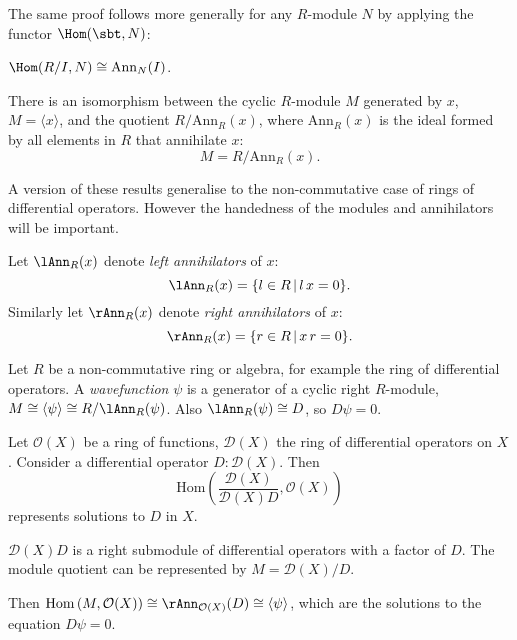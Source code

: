     The same proof follows more generally for any \(R\)-module \(N\) by applying the functor \( \Hom(\sbt, N)\):
    \begin{corollary}
       \(\Hom(R/I,N) \cong \mathrm{Ann}_{N}(I)\).
    \end{corollary}
       
    \begin{lem} There is an isomorphism between the cyclic \(R\)-module \(M\) generated by \(x\), \(M = \langle x \rangle \), and the quotient 
    \( R / \mathrm{Ann}_R(x)\), where \( \mathrm{Ann}_R(x)\) is the ideal formed by all elements in \(R\) that annihilate \(x\):
    \[M =R/\mathrm{Ann}_R(x).\]
    \end{lem}
    
    
    A version of these results generalise to the non-commutative case of rings of differential operators. However the handedness of the modules and annihilators will be important.
    
    \begin{defn}
    Let \( {\lAnn}_R(x) \) denote \emph{left annihilators} of \(x\):
    \[ {\lAnn}_R(x) = \{ l \in R\, | \, l\, x = 0\}. \]
    Similarly let \({\rAnn}_R(x)\) denote \emph{right annihilators} of \(x\):
    \[ {\rAnn}_R(x) = \{r \in R \,| \,x \,r = 0 \}. \]
    \end{defn}     
    

    Let \(R\) be a non-commutative ring or algebra, for example the ring of differential operators.  A \emph{wavefunction} \( \psi\) is a generator of a cyclic right \(R\)-module, \(M  \cong \langle \psi \rangle \cong R/{\lAnn}_R(\psi) \). Also \({\lAnn}_R(\psi) \cong D\), so \( D \psi = 0\).
    
    \begin{ex}\label{ex:sols}
    Let \( \mathcal{O}(X)\) be a ring of functions, \( \mathcal{D}(X)\) the ring of differential operators on \(X\). Consider a differential operator \( D : \mathcal{D}(X)\). Then 
    \[ \mathrm{Hom}\left(\frac{\mathcal{D}(X)}{  \mathcal{D}(X)  D } , \mathcal{O}(X) \right)\]  
    represents solutions to \(D\) in \(X\).
    
    \(\mathcal{D}(X)  D \) is a right submodule of differential operators with a factor of \(D\). The module quotient can be represented by \(M=\mathcal{D}(X)/D\).  
    
    Then \( \mathrm{Hom}\left(M, \mathcal{O}(X) \right) \cong {\rAnn}_{\mathcal{O}(X)}(D) \cong \langle \psi \rangle\), which are the solutions to the equation 
    \( D \psi = 0\).
    \end{ex}
